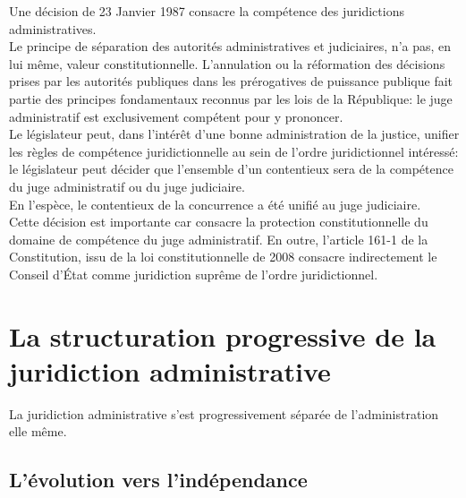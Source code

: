 \documentclass[12pt, a4paper, openany]{book}
\begin{document}
Une décision de 23 Janvier 1987 consacre la compétence des juridictions administratives. \\
Le principe de séparation des autorités administratives et judiciaires, n'a pas, en lui même, valeur constitutionnelle. L'annulation ou la réformation des décisions prises par les autorités publiques dans les prérogatives de puissance publique fait partie des principes fondamentaux reconnus par les lois de la République: le juge administratif est exclusivement compétent pour y prononcer. \\
Le législateur peut, dans l'intérêt d'une bonne administration de la justice, unifier les règles de compétence juridictionnelle au sein de l'ordre juridictionnel intéressé: le législateur peut décider que l'ensemble d'un contentieux sera de la compétence du juge administratif ou du juge judiciaire. \\
En l'espèce, le contentieux de la concurrence a été unifié au juge judiciaire. \\
Cette décision est importante car consacre la protection constitutionnelle du domaine de compétence du juge administratif. En outre, l'article 161-1 de la Constitution, issu de la loi constitutionnelle de 2008 consacre indirectement le Conseil d'État comme juridiction suprême de l'ordre juridictionnel. 


\section{La structuration progressive de la juridiction administrative}

La juridiction administrative s'est progressivement séparée de l'administration elle même. 

\subsection{L'évolution vers l'indépendance}
\end{document}
